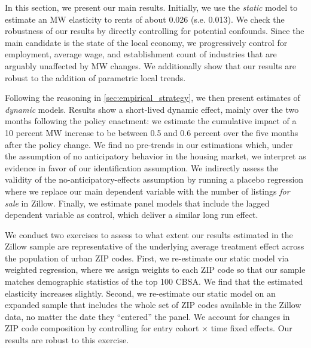 
In this section, we present our main results. Initially, we use the \textit{static} model
to estimate an MW elasticity to rents of about 0.026 (s.e. 0.013). We check the robustness 
of our results by directly controlling for potential confounds. Since the main candidate is 
the state of the local economy, we progressively control for employment, average wage, 
and establishment count of industries that are arguably unaffected by MW changes. We 
additionally show that our results are robust to the addition of parametric local trends.

Following the reasoning in \autoref{sec:empirical_strategy}, we then present estimates of 
\textit{dynamic} models. Results show a short-lived dynamic effect, mainly over the two
months following the policy enactment: we estimate the cumulative impact of a 10 percent MW 
increase to be between 0.5 and 0.6 percent over the five months after the policy change. 
We find no pre-trends in our estimations which, under the assumption of no anticipatory 
behavior in the housing market, we interpret as evidence in favor of our identification
assumption. We indirectly assess the validity of the no-anticipatory-effects assumption by 
running a placebo regression where we replace our main dependent variable with the number 
of listings \textit{for sale} in Zillow. Finally, we estimate panel models that include the 
lagged dependent variable as control, which deliver a similar long run effect.






We conduct two exercises to assess to what extent our results estimated in the Zillow sample 
are representative of the underlying average treatment effect across the population of urban
ZIP codes. First, we re-estimate our static model via weighted regression, where we assign 
weights to each ZIP code so that our sample matches demographic statistics of the top 100 
CBSA. We find that the estimated elasticity increases slightly. Second, we re-estimate our 
static model on an expanded sample that includes the whole set of ZIP codes available in the 
Zillow data, no matter the date they ``entered'' the panel. We account for changes in ZIP code 
composition by controlling for entry cohort $\times$ time fixed effects. Our results are 
robust to this exercise.


